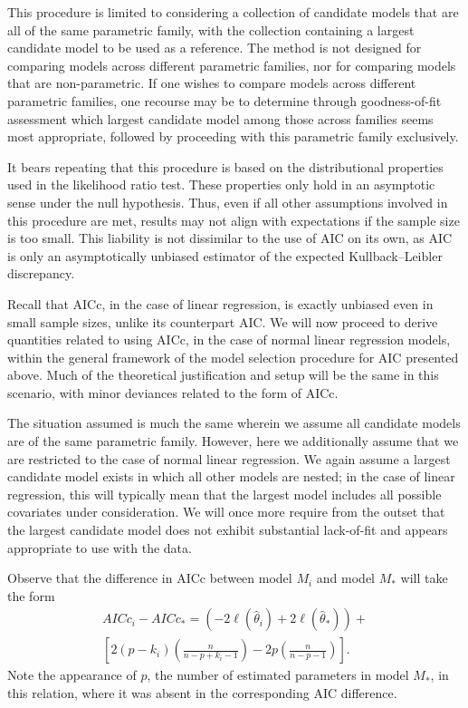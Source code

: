 		This procedure is limited to considering a collection of candidate models that are all of the same parametric family, with the collection containing a largest candidate
		model to be used as a reference. The method is not designed for comparing models across different parametric families, nor for comparing models that are non-parametric.
		If one wishes to compare models across different parametric families, one recourse may be to determine through goodness-of-fit assessment which largest candidate model
		among those across families seems most appropriate, followed by proceeding with this parametric family exclusively.

		It bears repeating that this procedure is based on the distributional properties used in the likelihood ratio test. These properties only hold in an asymptotic sense under the
		null hypothesis. Thus, even if all other assumptions involved in this procedure are met, results may not align with expectations if the sample size is too small. This liability is not
		dissimilar to the use of AIC on its own, as AIC is only an asymptotically unbiased estimator of the expected Kullback–Leibler discrepancy.

		Recall that AICc, in the case of linear regression, is exactly unbiased even in small sample sizes, unlike its counterpart AIC. We will now proceed to derive quantities related to using AICc,
		in the case of normal linear regression models, within the general framework of the model selection procedure for AIC presented above. Much of the theoretical
		justification and setup will be the same in this scenario, with minor deviances related to the form of AICc.

		The situation assumed is much the same wherein we assume all candidate models are of the same parametric family. However, here we additionally assume that we are
		restricted to the case of normal linear regression. We again assume a largest candidate model exists in which all other models are nested; in the case of linear
		regression, this will typically mean that the largest model includes all possible covariates under consideration. We will once more require from the outset that the largest candidate
		model does not exhibit substantial lack-of-fit and appears appropriate to use with the data.

		Observe that the difference in AICc between model $M_i$ and model $M_*$ will take the form
		\begin{equation*}
			\begin{split}
			AICc_i - AICc_* = (-2 \ell (\hat{\theta}_i) + 2 \ell (\hat{\theta}_*) ) + \\
			\left[ 2(p-k_i) \left( \frac{n}{n-p+k_i-1} \right) - 2p \left( \frac{n}{n-p-1} \right) \right] .
			\end{split}
		\end{equation*}
		Note the appearance of $p$, the number of estimated parameters in model $M_*$, in this relation, where it was absent in the corresponding AIC difference.

